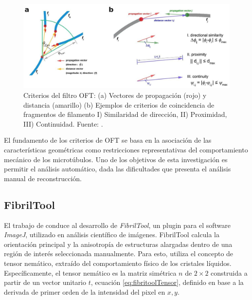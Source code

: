 \begin{figure}[h]
        \centering
        \includegraphics[scale=0.38]{imagenes/MT-OFT.jpeg}
        \caption[Criterios del filtro OFT.]{Criterios del filtro OFT: (a) Vectores de propagaci\'on (rojo) y distancia (amarillo) (b) Ejemplos de criterios de coincidencia de fragmentos de filamento I) Similaridad de direcci\'on, II) Proximidad, III) Continuidad. Fuente: \citet{zhang2017extracting}.}
        \label{fig:MTOFT}
\end{figure}


El fundamento de los criterios de OFT se basa en la asociaci\'on de las caracter\'isticas geom\'etricas como restricciones representativas del comportamiento mec\'anico de los microt\'ubulos. Uno de los objetivos de esta investigaci\'on es permitir el an\'alisis autom\'atico, dada las dificultades que presenta el an\'alisis manual de reconstrucci\'on. %


\subsection{FibrilTool}
El trabajo de \citet{boudaoud2014fibriltool} conduce al desarrollo de {\it FibrilTool}, un plugin para el software {\it ImageJ}, utilizado en an\'alisis cient\'ifico de im\'agenes. FibrilTool calcula la orientaci\'on principal y la anisotrop\'ia de estructuras alargadas dentro de una regi\'on de inter\'es seleccionada manualmente. Para esto, utiliza el concepto de tensor nem\'atico, extra\'ido del comportamiento f\'isico de los cristales l\'iquidos. Espec\'ificamente, el tensor nem\'atico es la matriz sim\'etrica $n$ de $2\times2$ construida a partir de un vector unitario $t$, ecuaci\'on \ref{eq:fibritoolTensor}, definido en base a la derivada de primer orden de la intensidad del pixel en $x,y$. %

